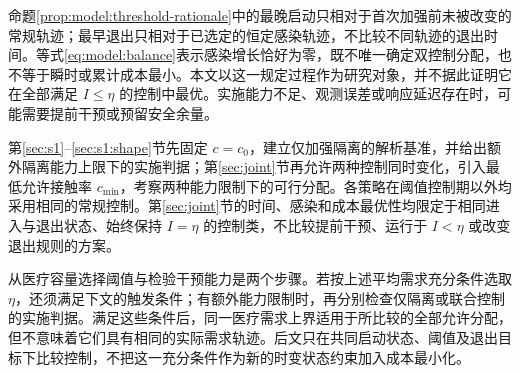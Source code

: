 \documentclass[lang=cn,a4paper,newtx]{elegantpaper}
\numberwithin{equation}{section}
\theoremstyle{plain}
\begin{document}
命题\ref{prop:model:threshold-rationale}中的最晚启动只相对于首次加强前未被改变的常规轨迹；最早退出只相对于已选定的恒定感染轨迹，不比较不同轨迹的退出时间。等式\eqref{eq:model:balance}表示感染增长恰好为零，既不唯一确定双控制分配，也不等于瞬时或累计成本最小。本文以这一规定过程作为研究对象，并不据此证明它在全部满足 $I\le\eta$ 的控制中最优。实施能力不足、观测误差或响应延迟存在时，可能需要提前干预或预留安全余量。

第\ref{sec:s1}--\ref{sec:s1:shape}节先固定 $c=c_0$，建立仅加强隔离的解析基准，并给出额外隔离能力上限下的实施判据；第\ref{sec:joint}节再允许两种控制同时变化，引入最低允许接触率 $c_{\min}$，考察两种能力限制下的可行分配。各策略在阈值控制期以外均采用相同的常规控制。第\ref{sec:joint}节的时间、感染和成本最优性均限定于相同进入与退出状态、始终保持 $I=\eta$ 的控制类，不比较提前干预、运行于 $I<\eta$ 或改变退出规则的方案。

从医疗容量选择阈值与检验干预能力是两个步骤。若按上述平均需求充分条件选取 $\eta$，还须满足下文的触发条件；有额外能力限制时，再分别检查仅隔离或联合控制的实施判据。满足这些条件后，同一医疗需求上界适用于所比较的全部允许分配，但不意味着它们具有相同的实际需求轨迹。后文只在共同启动状态、阈值及退出目标下比较控制，不把这一充分条件作为新的时变状态约束加入成本最小化。
\end{document}
